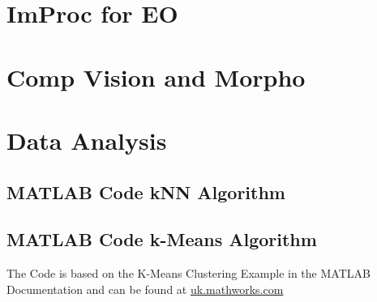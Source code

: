 \appendix
\section{ ImProc for EO}

\section{Comp Vision and Morpho}

\section{Data Analysis}

\subsection{MATLAB Code kNN Algorithm}
\label{apdx:kNN}


\subsection{MATLAB Code k-Means Algorithm}
\label{apdx:kmeans}
The Code is based on the K-Means Clustering Example in the MATLAB Documentation and can be found at \href{https://uk.mathworks.com/help/images/examples/color-based-segmentation-using-k-means-clustering.html}{uk.mathworks.com}
